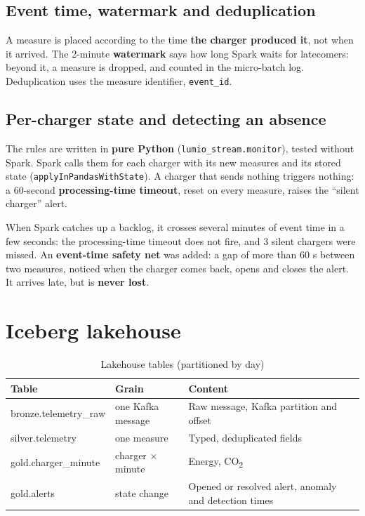 \documentclass[11pt, a4paper, oneside, headings=normal, numbers=noenddot, DIV=12]{scrartcl}
\begin{document}
\subsection{Event time, watermark and deduplication}
A measure is placed according to the time \textbf{the charger produced it}, not when it arrived. The 2-minute \textbf{watermark} says how long
Spark waits for latecomers: beyond it, a measure is dropped, and counted in the micro-batch log. Deduplication uses the measure identifier,
\texttt{event\_id}.

\subsection{Per-charger state and detecting an absence}
The rules are written in \textbf{pure Python} (\texttt{lumio\_stream.monitor}), tested without Spark. Spark calls them for each charger with its new
measures and its stored state (\texttt{applyInPandasWithState}). A charger that sends nothing triggers nothing: a 60-second
\textbf{processing-time timeout}, reset on every measure, raises the ``silent charger'' alert.

\begin{warnbox}
When Spark catches up a backlog, it crosses several minutes of event time in a few seconds: the processing-time timeout does not fire, and 3 silent
chargers were missed. An \textbf{event-time safety net} was added: a gap of more than 60 s between two measures, noticed when the charger comes back,
opens and closes the alert. It arrives late, but is \textbf{never lost}.
\end{warnbox}

\section{Iceberg lakehouse}

\begin{table}[H]
\centering\small
\begin{tabularx}{\linewidth}{@{}L{3.6cm} L{3.2cm} Y@{}}
\toprule
\textbf{Table} & \textbf{Grain} & \textbf{Content} \\
\midrule
bronze.telemetry\_raw & one Kafka message & Raw message, Kafka partition and offset \\
silver.telemetry & one measure & Typed, deduplicated fields \\
gold.charger\_minute & charger × minute & Energy, CO\textsubscript{2} \\
gold.alerts & state change & Opened or resolved alert, anomaly and detection times \\
\bottomrule
\end{tabularx}
\caption{Lakehouse tables (partitioned by day)}
\end{table}
\end{document}
